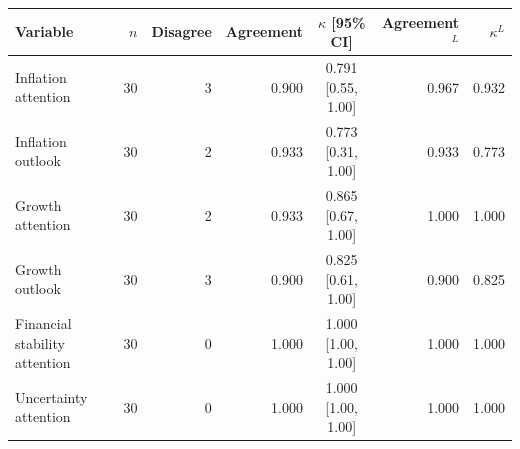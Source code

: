 \begin{tabular}{lrrrc rr}
\toprule
Variable & $n$ & Disagree & Agreement & $\kappa$ [95\% CI] & Agreement$^{L}$ & $\kappa^{L}$ \\
\midrule
Inflation attention & 30 & 3 & 0.900 & 0.791 [0.55, 1.00] & 0.967 & 0.932 \\
Inflation outlook & 30 & 2 & 0.933 & 0.773 [0.31, 1.00] & 0.933 & 0.773 \\
Growth attention & 30 & 2 & 0.933 & 0.865 [0.67, 1.00] & 1.000 & 1.000 \\
Growth outlook & 30 & 3 & 0.900 & 0.825 [0.61, 1.00] & 0.900 & 0.825 \\
Financial stability attention & 30 & 0 & 1.000 & 1.000 [1.00, 1.00] & 1.000 & 1.000 \\
Uncertainty attention & 30 & 0 & 1.000 & 1.000 [1.00, 1.00] & 1.000 & 1.000 \\
\bottomrule
\end{tabular}
